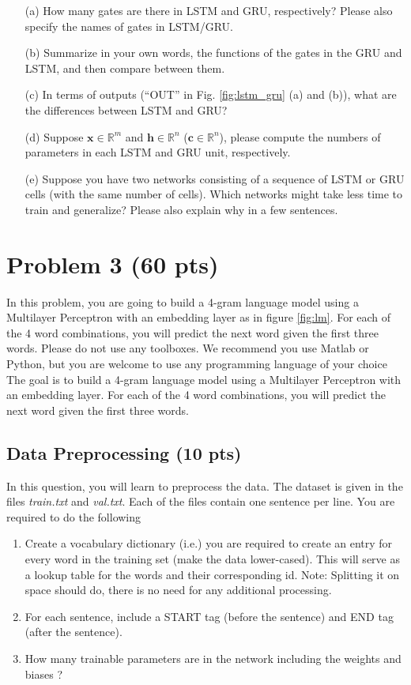 \documentclass[10pt]{article}
\begin{document}
\begin{itemize}
\item[(a)] How many gates are there in LSTM and GRU, respectively? Please also specify the names of gates in LSTM/GRU.
\item[(b)] Summarize in your own words, the functions of the gates in the GRU and LSTM, and then compare between them. 
\item[(c)] In terms of outputs (``OUT'' in Fig. \ref{fig:lstm_gru} (a) and (b)), what are the differences between LSTM and GRU? 
\item[(d)] Suppose $\mathbf{x}\in \mathbb{R}^m$ and $\mathbf{h} \in \mathbb{R}^n$ ($\mathbf{c} \in \mathbb{R}^n$), please compute the numbers of parameters in each LSTM and GRU unit, respectively.
\item[(e)] Suppose you have two networks consisting of a sequence of LSTM or GRU cells (with the same number of cells). Which networks might take less time to train and generalize? Please also explain why in a few sentences. 
\end{itemize}



\section{Problem 3 (60 pts)}

 In this problem, you are going to build a 4-gram language model using a Multilayer Perceptron with an embedding layer as in figure \ref{fig:lm}. For each of the 4 word combinations, you will predict the next word given the first three words. Please do not use any toolboxes. We recommend you use Matlab or Python, but you are welcome to use any programming language of your choice
\\
The goal is to build a 4-gram language model using a Multilayer Perceptron with an embedding layer. For each of the 4 word combinations, you will predict the next word given the first three words. 

\subsection{Data Preprocessing (10 pts)}
In this question, you will learn to preprocess the data. The dataset is given in the files \emph{train.txt} and \emph{val.txt}. Each of the files contain one sentence per line. You are required to do the following


\begin{enumerate}
\item Create a vocabulary dictionary (i.e.) you are required to create an entry for every word in the training set (make the data lower-cased). This will serve as a lookup table for the words and their corresponding id. Note: Splitting it on space should do, there is no need for any additional processing. 
\item For each sentence, include a START tag (before the sentence) and END tag (after the sentence). 
\item How many trainable parameters are in the network including the weights and biases ?
\end{enumerate}
\end{document}
